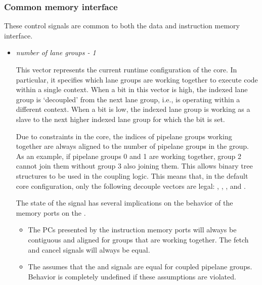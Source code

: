 
\subsubsection{Common memory interface}
\label{sec:core-ug-cfg-inst-iface-cmem}

These control signals are common to both the data and instruction memory 
interface.

\begin{itemize}

\item {}\textit{number of lane groups - 1}

This vector represents the current runtime configuration of the core. In 
particular, it specifies which lane groups are working together to execute code 
within a single context. When a bit in this vector is high, the indexed lane 
group is `decoupled' from the next lane group, i.e., is operating within a 
different context. When a bit is low, the indexed lane group is working as a 
slave to the next higher indexed lane group for which the bit is set.

Due to constraints in the core, the indices of pipelane groups working together 
are always aligned to the number of pipelane groups in the group. As an example, 
if pipelane groups 0 and 1 are working together, group 2 cannot join them 
without group 3 also joining them. This allows binary tree structures to be used 
in the coupling logic. This means that, in the default core configuration, only 
the following decouple vectors are legal: , , 
,  and .

The state of the  signal has several implications on the 
behavior of the memory ports on the \rvex{}.

\begin{itemize}

\item The PCs presented by the instruction memory ports will always be 
contiguous and aligned for groups that are working together. The fetch and 
cancel signals will always be equal.

\item The \rvex{} assumes that the  and 
 signals are equal for coupled pipelane groups. 
Behavior is completely undefined if these assumptions are violated.

\end{itemize}


\end{itemize}
